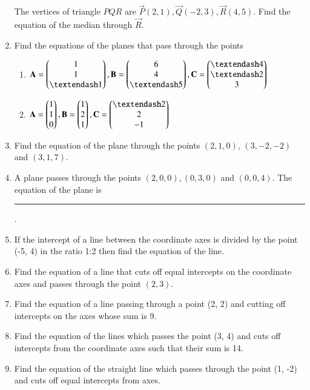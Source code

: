 \begin{enumerate}[label=\thesubsection.\arabic*, ref=\thesubsection.\theenumi]
The vertices of triangle $PQR$ are $\vec{P}(2, 1),  \vec{Q}(-2, 3),  \vec{R}(4, 5)$. Find the equation of the median through $\vec{R}$.
\label{chapters/11/10/2/9}
\\
\solution

	\item Find the equations of the planes that pass through the points
\begin{enumerate}
\item $\vec{A}= \myvec{1\\1\\– 1},  \vec{B}=\myvec{6\\4\\– 5}, \vec{C}= \myvec{– 4\\– 2\\3}$
\item $\vec{A}= \myvec{1\\1\\0},  \vec{B}= \myvec{1\\2\\1},  \vec{C}= \myvec{– 2\\2\\-1}$
\end{enumerate}
    \solution
		
\item Find the equation of the plane through the points $(2, 1, 0)$,  $(3, -2, -2)$ and $(3, 1, 7)$.
\item A plane passes through the points $(2, 0, 0),  (0, 3, 0)$ and $(0, 0, 4)$. The equation of the plane is \noindent\rule{2cm}{0.4pt}.
\item If the intercept of a line between the coordinate axes is divided by the point (-5, 4) in the ratio 1:2 then find the equation of the line.
\item Find the equation of a line that cuts off equal intercepts on the coordinate axes and passes through the point $(2, 3)$.  
	\\
\solution 
\label{chapters/11/10/2/12}

\item 
Find the equation of a line passing through a point (2, 2) and cutting off intercepts on the axes whose sum is 9.
\label{chapters/11/10/2/13}
	\\
	\solution 

\item Find the equation of the lines which passes the point (3, 4) and cuts off intercepts from the coordinate axes such that their sum is 14.
\item Find the equation of the straight line which passes through the point (1,  -2) and cuts off equal intercepts from axes.

\end{enumerate}
